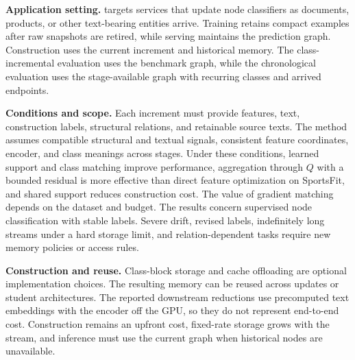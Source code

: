 \noindent\textbf{Application setting.}
\method{} targets services that update node classifiers as documents, products,
or other text-bearing entities arrive. Training retains compact examples after
raw snapshots are retired, while serving maintains the prediction graph.
Construction uses the current increment and historical memory. The
class-incremental evaluation uses the benchmark graph, while the chronological
evaluation uses the stage-available graph with recurring classes and arrived
endpoints.

\noindent\textbf{Conditions and scope.}
Each increment must provide features, text, construction labels, structural
relations, and retainable source texts. The method assumes compatible
structural and textual signals, consistent feature coordinates, encoder, and
class meanings across stages. Under these conditions, learned support and
class matching improve performance, aggregation through $Q$ with a bounded
residual is more effective than direct feature optimization on SportsFit, and
shared support reduces construction cost. The value of gradient matching
depends on the dataset and budget. The results concern supervised node
classification with stable labels. Severe drift, revised labels, indefinitely
long streams under a hard storage limit, and relation-dependent tasks require
new memory policies or access rules.

\noindent\textbf{Construction and reuse.}
Class-block storage and cache offloading are optional implementation choices.
The resulting memory can be reused across updates or student architectures.
The reported downstream reductions use precomputed text embeddings with the
encoder off the GPU, so they do not represent end-to-end cost. Construction
remains an upfront cost, fixed-rate storage grows with the stream, and
inference must use the current graph when historical nodes are unavailable.
